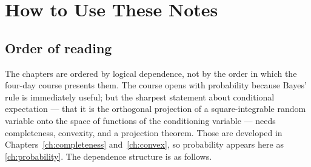 \chapter*{How to Use These Notes}

\section*{Order of reading}

The chapters are ordered by logical dependence, not by the order in which the
four-day course presents them. The course opens with probability because Bayes'
rule is immediately useful; but the sharpest statement about conditional
expectation --- that it is the orthogonal projection of a square-integrable
random variable onto the space of functions of the conditioning variable --- needs
completeness, convexity, and a projection theorem. Those are developed in
Chapters~\ref{ch:completeness} and~\ref{ch:convex}, so probability appears here as
\autoref{ch:probability}. The dependence structure is as follows.

